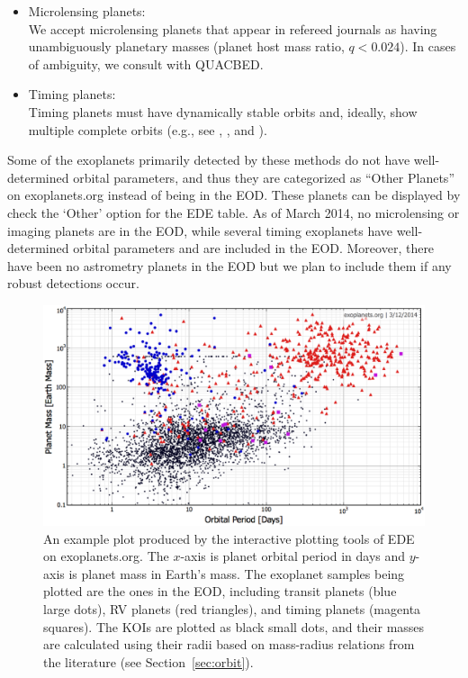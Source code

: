 \documentclass[11pt,preprint]{aastex}
\begin{document}
\begin{CJK*}{UTF8}{gbsn}
\begin{itemize}
\begin{enumerate}
\end{enumerate}
\item Microlensing planets:\\
We accept microlensing planets that appear in refereed journals as
having unambiguously planetary masses (planet host mass ratio,
$q<0.024$). In cases of ambiguity, we consult with QUACBED.  

\item Timing planets:\\
 Timing planets must have dynamically stable orbits and, ideally, show
 multiple complete orbits (e.g., see \citealt{Wittenmyer2012},
 \citealt{Horner2012}, and \citealt{Wittenmyer2013}). 

\end{itemize}
Some of the exoplanets primarily detected by these methods do not have
well-determined orbital parameters, and thus they are categorized as
``Other Planets'' on exoplanets.org instead of being in the EOD. These
planets can be displayed by check the `Other' option for the EDE
table. As of March 2014, no microlensing or imaging planets are in the
EOD, while several timing exoplanets have well-determined orbital
parameters and are included in the EOD. Moreover, there have been no astrometry planets in the EOD but we plan to include them if any robust detections occur.


\begin{figure}[!htb]
\centering
\includegraphics[width=\textwidth]{../fig/mass-per-color.eps}
\caption{An example plot produced by the interactive plotting tools of
  EDE on exoplanets.org. The $x$-axis is planet orbital period in days
  and $y$-axis is planet mass in Earth's mass. The exoplanet samples
  being plotted are the ones in the EOD, including transit planets
  (blue large dots), RV planets (red triangles), and timing planets
  (magenta squares). The KOIs are plotted as black small dots, and
  their masses are calculated using their radii based on mass-radius
  relations from the literature (see Section~\ref{sec:orbit}).}
\label{fig:koi}
\end{figure}



\end{CJK*}
\end{document}
